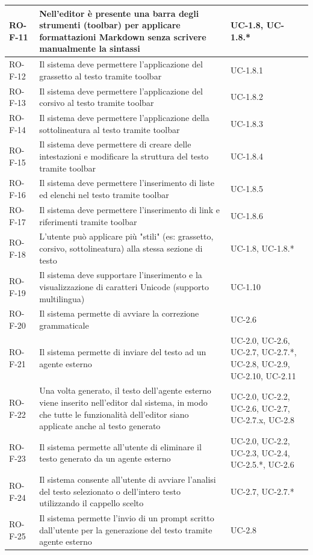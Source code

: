\documentclass[11pt,a4paper]{article}
\begin{document}
\begin{longtable}{|p{}|>{\raggedright\arraybackslash}p{}|p{}|}
\hline
RO-F-11 & Nell'editor è presente una barra degli strumenti (toolbar) per applicare formattazioni Markdown senza scrivere manualmente la sintassi & UC-1.8, UC-1.8.* \\
\hline
RO-F-12 & Il sistema deve permettere l'applicazione del grassetto al testo tramite toolbar & UC-1.8.1 \\
\hline
RO-F-13 & Il sistema deve permettere l'applicazione del corsivo al testo tramite toolbar & UC-1.8.2 \\
\hline
RO-F-14 & Il sistema deve permettere l'applicazione della sottolineatura al testo tramite toolbar & UC-1.8.3 \\
\hline
RO-F-15 & Il sistema deve permettere di creare delle intestazioni e modificare la struttura del testo tramite toolbar & UC-1.8.4 \\
\hline
RO-F-16 & Il sistema deve permettere l'inserimento di liste ed elenchi nel testo tramite toolbar & UC-1.8.5 \\
\hline
RO-F-17 & Il sistema deve permettere l'inserimento di link e riferimenti tramite toolbar & UC-1.8.6 \\
\hline
RO-F-18 & L'utente può applicare più "stili" (es: grassetto, corsivo, sottolineatura) alla stessa sezione di testo & UC-1.8, UC-1.8.* \\
\hline
RO-F-19 & Il sistema deve supportare l'inserimento e la visualizzazione di caratteri Unicode (supporto multilingua) & UC-1.10 \\
\hline
RO-F-20 & Il sistema permette di avviare la correzione grammaticale & UC-2.6 \\
\hline
RO-F-21 & Il sistema permette di inviare del testo ad un agente esterno & UC-2.0, UC-2.6, UC-2.7, UC-2.7.*, UC-2.8, UC-2.9, UC-2.10, UC-2.11 \\
\hline
RO-F-22 & Una volta generato, il testo dell'agente esterno viene inserito nell'editor dal sistema, in modo che tutte le funzionalità dell'editor siano applicate anche al testo generato & UC-2.0, UC-2.2, UC-2.6, UC-2.7, UC-2.7.x, UC-2.8 \\
\hline
RO-F-23 & Il sistema permette all'utente di eliminare il testo generato da un agente esterno & UC-2.0, UC-2.2, UC-2.3, UC-2.4, UC-2.5.*, UC-2.6 \\
\hline
RO-F-24 & Il sistema consente all'utente di avviare l'analisi del testo selezionato o dell'intero testo utilizzando il cappello scelto & UC-2.7, UC-2.7.* \\
\hline
RO-F-25 & Il sistema permette l'invio di un prompt scritto dall’utente per la generazione del testo tramite agente esterno & UC-2.8 \\

\end{longtable}
\end{document}
